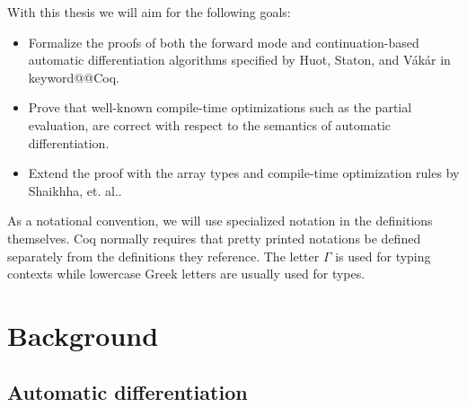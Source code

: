 \documentclass[11pt, final]{article}
\makeatletter
\def\Vakar{V\'{a}k\'{a}r}
\def\<#1>{\csname keyword@@#1\endcsname}
\makeatother
\begin{document}

With this thesis we will aim for the following goals:
\begin{itemize}
  \item Formalize the proofs of both the forward mode and continuation-based automatic differentiation algorithms specified by Huot, Staton, and \Vakar{} \cite{huot2020correctness} in \<Coq>.
  \item Prove that well-known compile-time optimizations such as the partial evaluation, are correct with respect to the semantics of automatic differentiation.
  \item Extend the proof with the array types and compile-time optimization rules by Shaikhha, et. al.\cite{Shaikha2019}.
\end{itemize}

As a notational convention, we will use specialized notation in the definitions themselves. Coq normally requires that pretty printed notations be defined separately from the definitions they reference. The letter $\Gamma$ is used for typing contexts while lowercase Greek letters are usually used for types.

\section{Background}

\subsection{Automatic differentiation}
\end{document}
